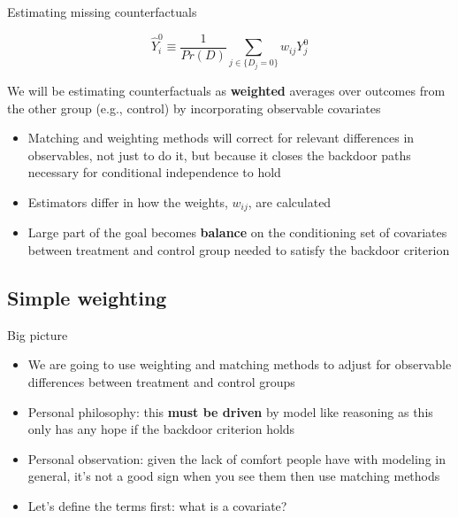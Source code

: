 \documentclass{beamer}
\begin{document}
\begin{frame}{Estimating missing counterfactuals}

$$\widehat{Y}^0_i \equiv \frac{1}{Pr(D)} \sum_{j \in \{D_j=0\}}w_{ij}Y_j^0$$

\bigskip
We will be estimating counterfactuals as \textbf{weighted} averages over outcomes from the other group (e.g., control) by incorporating observable covariates

\begin{itemize}
  \item Matching and weighting methods will correct for relevant differences in observables, not just to do it, but because it closes the backdoor paths necessary for conditional independence to hold
  \item Estimators differ in how the weights, $w_{ij}$, are calculated
  \item Large part of the goal becomes \textbf{balance} on the conditioning set of covariates between treatment and control group needed to satisfy the backdoor criterion
\end{itemize}

\end{frame}

\subsection{Simple weighting}

\begin{frame}{Big picture}

\begin{itemize}
\item We are going to use weighting and matching methods to adjust for observable differences between treatment and control groups
\item Personal philosophy: this \textbf{must be driven} by model like reasoning as this only has any hope if the backdoor criterion holds
\item Personal observation: given the lack of comfort people have with modeling in general, it's not a good sign when you see them then use matching methods
\item Let's define the terms first: what is a covariate?
\end{itemize}

\end{frame}
\end{document}
